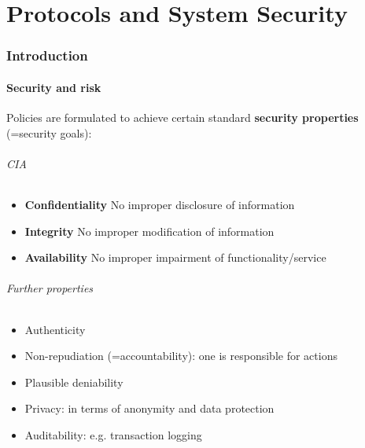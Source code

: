 \part{Protocols and System Security}

\section{Introduction}

\subsection{Security and risk}

Policies are formulated to achieve certain standard \textbf{security properties} (=security goals):

\paragraph{CIA}
\begin{itemize}
    \item \textbf{Confidentiality} No improper disclosure of information 
    \item\textbf{Integrity} No improper modification of information
    \item \textbf{Availability} No improper impairment of functionality/service
\end{itemize}

\paragraph{Further properties}
\begin{itemize}
    \item Authenticity
    \item Non-repudiation (=accountability): one is responsible for actions
    \item Plausible deniability
    \item Privacy: in terms of anonymity and data protection 
    \item Auditability: e.g. transaction logging
\end{itemize}

